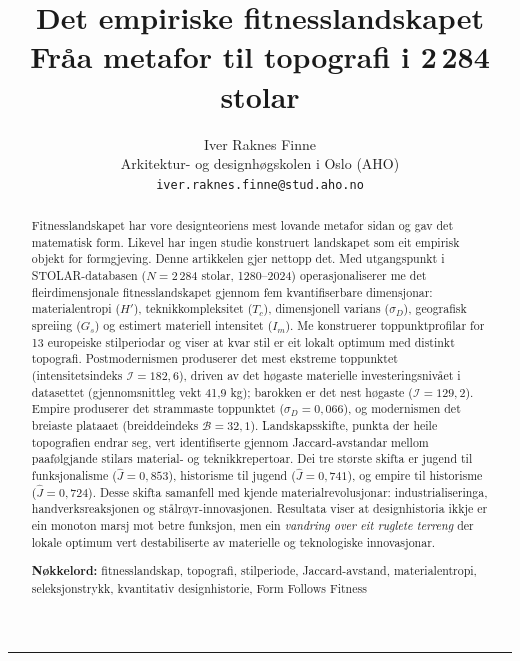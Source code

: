 \documentclass[10pt, a4paper, twocolumn]{article}
\title{%
  \textbf{Det empiriske fitnesslandskapet}\\[0.4em]
  \large Fr\r{a}a metafor til topografi i 2\,284 stolar%
}
\author{%
  Iver Raknes Finne\\
  \small Arkitektur- og designh\o gskolen i Oslo (AHO)\\
  \small \texttt{iver.raknes.finne@stud.aho.no}
}
\date{}
\begin{document}
\maketitle

\begin{abstract}
\noindent Fitnesslandskapet har vore designteoriens mest lovande metafor sidan \citet{wright1932} og \citet{kauffman1993} gav det matematisk form. Likevel har ingen studie konstruert landskapet som eit empirisk objekt for formgjeving. Denne artikkelen gjer nettopp det. Med utgangspunkt i STOLAR-databasen ($N = 2\,284$ stolar, 1280--2024) operasjonaliserer me det fleirdimensjonale fitnesslandskapet gjennom fem kvantifiserbare dimensjonar: materialentropi ($H'$), teknikkompleksitet ($T_c$), dimensjonell varians ($\sigma_D$), geografisk spreiing ($G_s$) og estimert materiell intensitet ($I_m$). Me konstruerer toppunktprofilar for 13 europeiske stilperiodar og viser at kvar stil er eit lokalt optimum med distinkt topografi. Postmodernismen produserer det mest ekstreme toppunktet (intensitetsindeks $\mathcal{I} = 182{,}6$), driven av det h\o gaste materielle investeringsniv\r{a}et i datasettet (gjennomsnittleg vekt 41{,}9 kg); barokken er det nest h\o gaste ($\mathcal{I} = 129{,}2$). Empire produserer det strammaste toppunktet ($\sigma_D = 0{,}066$), og modernismen det breiaste plataaet (breiddeindeks $\mathcal{B} = 32{,}1$). Landskapsskifte, punkta der heile topografien endrar seg, vert identifiserte gjennom Jaccard-avstandar mellom paaf\o lgjande stilars material- og teknikkrepertoar. Dei tre st\o rste skifta er jugend til funksjonalisme ($\hat{J} = 0{,}853$), historisme til jugend ($\hat{J} = 0{,}741$), og empire til historisme ($\hat{J} = 0{,}724$). Desse skifta samanfell med kjende materialrevolusjonar: industrialiseringa, handverksreaksjonen og st\r{a}lr\o yr-innovasjonen. Resultata viser at designhistoria ikkje er ein monoton marsj mot betre funksjon, men ein \emph{vandring over eit ruglete terreng} der lokale optimum vert destabiliserte av materielle og teknologiske innovasjonar.

\medskip
\noindent\textbf{N\o kkelord:} fitnesslandskap, topografi, stilperiode, Jaccard-avstand, materialentropi, seleksjonstrykk, kvantitativ designhistorie, Form Follows Fitness
\end{abstract}

\vspace{1em}
\hrule
\vspace{1.5em}
\end{document}
